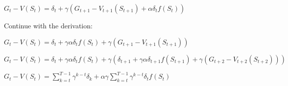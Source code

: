 \documentclass[11pt]{article}
\begin{document}
   $G_t-V(S_t) = \delta_t + \gamma (G_{t+1} - V_{t+1}(S_{t+1}) + \alpha \delta_t f(S_t)) $

    Continue with the derivation:

    $G_t-V(S_t) = \delta_t + \gamma \alpha \delta_t f(S_t) + \gamma (G_{t+1} - V_{t+1}(S_{t+1})) $

    $G_t-V(S_t) = \delta_t + \gamma \alpha \delta_t f(S_t) + \gamma (  \delta_{t+1} + \gamma \alpha \delta_{t+1} f(S_{t+1}) + \gamma (G_{t+2} - V_{t+2}(S_{t+2})) ) $

    $G_t-V(S_t) = \sum_{k=t}^{T-1} \gamma^{k-t} \delta_k + \alpha \gamma \sum_{k=t}^{T-1} \gamma^{k-t}  \delta_t f(S_t)$
\end{document}
